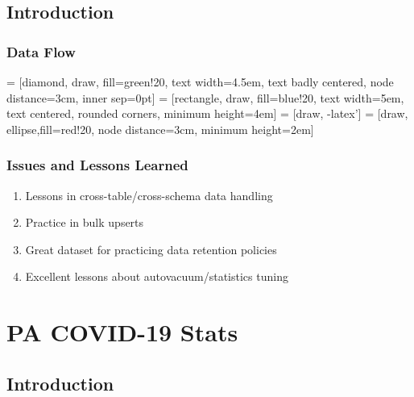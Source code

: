 \documentclass[aspectratio=169]{beamer}
\begin{document}
\subsection{Introduction}
\begin{frame}
  \frametitle{Data Flow}
   = [diamond, draw, fill=green!20, text width=4.5em, text badly centered, node distance=3cm, inner sep=0pt]
   = [rectangle, draw, fill=blue!20, text width=5em, text centered, rounded corners, minimum height=4em]
   = [draw, -latex']
   = [draw, ellipse,fill=red!20, node distance=3cm, minimum height=2em]

\end{frame}

\begin{frame}[fragile]
  \frametitle{Issues and Lessons Learned}
  \begin{enumerate}
    \item{Lessons in cross-table/cross-schema data handling}
    \item{Practice in bulk upserts}
    \item{Great dataset for practicing data retention policies}
    \item{Excellent lessons about autovacuum/statistics tuning}
  \end{enumerate}
\end{frame}

\section{PA COVID-19 Stats}
\frame{\sectionpage}
\subsection{Introduction}
\end{document}
